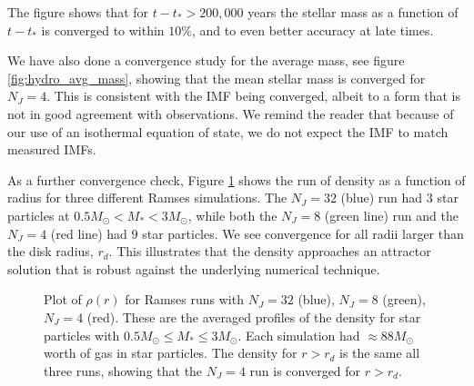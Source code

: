 \documentclass[../dissertation.tex]{subfiles}
\begin{document}
The figure shows that for $t - t_* > 200,000$ years the stellar mass as a function of $t-t_*$ is converged to within $10 \%$, and to even better accuracy at late times.

We have also done a convergence study for the average mass, see figure \ref{fig:hydro_avg_mass}, showing that the mean stellar mass is converged for $N_J=4$. This is consistent with the IMF being converged, albeit to a form that is not in good agreement with observations. We remind the reader that because of our use of an isothermal equation of state, we do not expect the IMF to match measured IMFs.

As a further convergence check, Figure \ref{fig:hydro_density_convergence} shows the run of density as a function of radius for three different Ramses simulations. The $N_J = 32$ (blue) run had $3$ star particles at $0.5M_\odot<M_*<3 M_\odot$, while both the $N_J = 8$ (green line) run and the $N_J = 4$ (red line) had $9$ star particles.
We see convergence for all radii larger than the disk radius, $r_d$.  This illustrates that the density approaches an attractor solution that is robust against the underlying numerical technique. 

\begin{figure}[htb]
\caption[Hydro Average run of density for sink particles $0.5 - 3.0 \Msun$]{Plot of $\rho(r)$ for Ramses runs with $N_J = 32$ (blue), $N_J = 8$ (green), $N_J = 4$ (red). These are the averaged profiles of the density for star particles with $0.5M_\odot\leq M_*\leq 3 M_\odot$. Each simulation had $\approx 88 M_\odot$ worth of gas in star particles. The density for $r>r_d$ is the same all three runs, showing that the $N_J=4$ run is converged for $r>r_d$. \label{fig:hydro_density_convergence}}
\end{figure}
\end{document}
